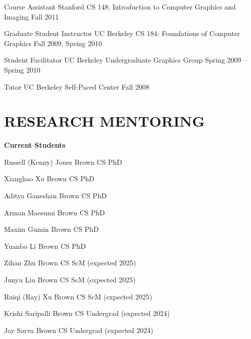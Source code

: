 \documentclass[line,margin]{res}
\begin{document}
\begin{resume}
\teach
{Course Assistant}
{Stanford CS 148: Introduction to Computer Graphics and Imaging}
{Fall 2011}

\teach
{Graduate Student Instructor}
{UC Berkeley CS 184: Foundations of Computer Graphics}
{Fall 2009, Spring 2010}

\teach
{Student Facilitator}
{UC Berkeley Undergraduate Graphics Group}
{Spring 2009 -- Spring 2010}

\teach
{Tutor}
{UC Berkeley Self-Paced Center}
{Fall 2008}


\section{RESEARCH MENTORING}

\newcommand{\currentphd}[2] {
	#1 \hfill #2
}

\newcommand{\student}[3] {
	#1 \hfill #2 (expected #3)
}

\newcommand{\alumni}[4] {
	#1 \hfill #2 #3\\
	\emph{Next position: #4}
}

\newcommand{\visitor}[4] {
	#1 \hfill #2 #3\\
	\emph{Home institution: #4}
}

\newcommand{\thesiscomm}[3] {
	#1 \hfill #2\\
	\emph{#3}
}


\textbf{Current Students}

\currentphd
{Russell (Kenny) Jones}
{Brown CS PhD}

\currentphd
{Xianghao Xu}
{Brown CS PhD}

\currentphd
{Aditya Ganeshan}
{Brown CS PhD}

\currentphd
{Arman Maesumi}
{Brown CS PhD}

\currentphd
{Maxim Gumin}
{Brown CS PhD}

\currentphd
{Yuanbo Li}
{Brown CS PhD}

\student
{Zihan Zhu}
{Brown CS ScM}
{2025}

\student
{Junyu Liu}
{Brown CS ScM}
{2025}

\student
{Ruiqi (Ray) Xu}
{Brown CS ScM}
{2025}

\student
{Krishi Saripalli}
{Brown CS Undergrad}
{2024}

\student
{Jay Sarva}
{Brown CS Undergrad}
{2024}


\end{resume}
\end{document}
